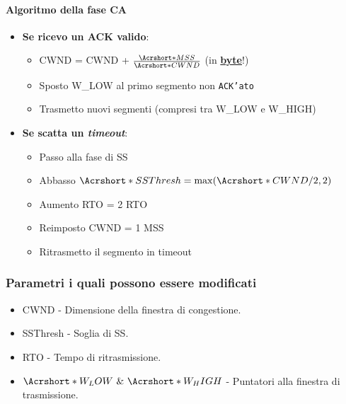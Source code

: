             \paragraph{Algoritmo della fase \Acrlong*{CA}}
            \begin{itemize}
                \item \textbf{Se ricevo un \Acrshort*{ACK} valido}:\begin{itemize}
                        \item \Acrshort*{CWND} = \Acrshort*{CWND} + $ \frac{\Acrshort*{MSS}}{\Acrshort*{CWND}} $ (in \underline{\textbf{byte}}!)
                        \item Sposto \Acrshort*{W_LOW} al primo segmento non \texttt{ACK'ato}
                        \item Trasmetto nuovi segmenti (compresi tra \Acrshort*{W_LOW} e \Acrshort*{W_HIGH})
                    \end{itemize}
                \item \textbf{Se scatta un \textit{timeout}}: \begin{itemize}
                        \item Passo alla fase di \Acrlong*{SS}
                        \item Abbasso $ \Acrshort*{SSThresh} = \max(\Acrshort*{CWND}/2, 2) $
                        \item Aumento \Acrshort*{RTO} = 2 \Acrshort*{RTO}
                        \item Reimposto \Acrshort*{CWND} = 1 \Acrshort*{MSS}
                        \item Ritrasmetto il segmento in timeout
                \end{itemize}
            \end{itemize}
        \subsubsection{Parametri i quali possono essere modificati}
            \begin{itemize}
                \item \Acrfull*{CWND} -  Dimensione della finestra di congestione.
                \item \acrfull*{SSThresh} - Soglia di \Acrlong*{SS}.
                \item \Acrfull*{RTO} - Tempo di ritrasmissione.
                \item \textbf{$\Acrshort*{W_LOW}\ \&\ \Acrshort*{W_HIGH}$} - Puntatori alla finestra di trasmissione.
            \end{itemize}
